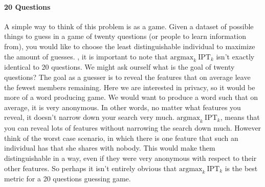 \documentclass[12pt]{article}
\newcommand{\priv}{\text{IPT}}
\begin{document}
\paragraph{20 Questions}
A simple way to think of this problem is as a game. Given a dataset of possible things to guess in a game of twenty questions (or people to learn information from), you would like to choose the least distinguishable individual to maximize the amount of guesses. , it is important to note that $\text{argmax}_k \ \priv_k$ isn't exactly identical to 20 questions. We might ask ourself what is the goal of twenty questions? The goal as a guesser is to reveal the features that on average leave the fewest members remaining. Here we are interested in privacy, so it would be more of a word producing game. We would want to produce a word such that on average, it is very anonymous. In other words, no matter what features you reveal, it doesn't narrow down your search very much. $\text{argmax}_k \ \priv_k$, means that you can reveal lots of features without narrowing the search down much. However think of the worst case scenario, in which there is one feature that such an individual has that she shares with nobody. This would make them distinguishable in a way, even if they were very anonymous with respect to their other features. So perhaps it isn't entirely obvious that $\text{argmax}_k \ \priv_k$ is the best metric for a 20 questions guessing game.
\end{document}
